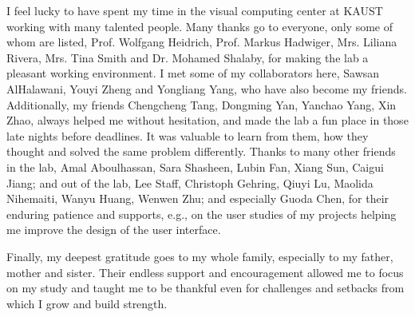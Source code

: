 I feel lucky to have spent my time in the visual computing center at KAUST working with many talented people. Many thanks go to everyone, only some of whom are listed, Prof. Wolfgang Heidrich, Prof. Markus Hadwiger, Mrs. Liliana Rivera, Mrs. Tina Smith and Dr. Mohamed Shalaby, for making the lab a pleasant working environment. I met some of my collaborators here, Sawsan AlHalawani, Youyi Zheng and Yongliang Yang, who have also become my friends. Additionally, my friends Chengcheng Tang, Dongming Yan, Yanchao Yang, Xin Zhao, always helped me without hesitation, and made the lab a fun place in those late nights before deadlines. It was valuable to learn from them, how they thought and solved the same problem differently. Thanks to many other friends in the lab, Amal Aboulhassan, Sara Shasheen, Lubin Fan, Xiang Sun, Caigui Jiang; and out of the lab, Lee Staff, Christoph Gehring, Qiuyi Lu, Maolida Nihemaiti, Wanyu Huang, Wenwen Zhu; and especially Guoda Chen, for their enduring patience and supports, e.g., on the user studies of my projects helping me improve the design of the user interface.

Finally, my deepest gratitude goes to my whole family, especially to my father, mother and sister. Their endless support and encouragement allowed me to focus on my study and taught me to be thankful even for challenges and setbacks from which I grow and build strength.








